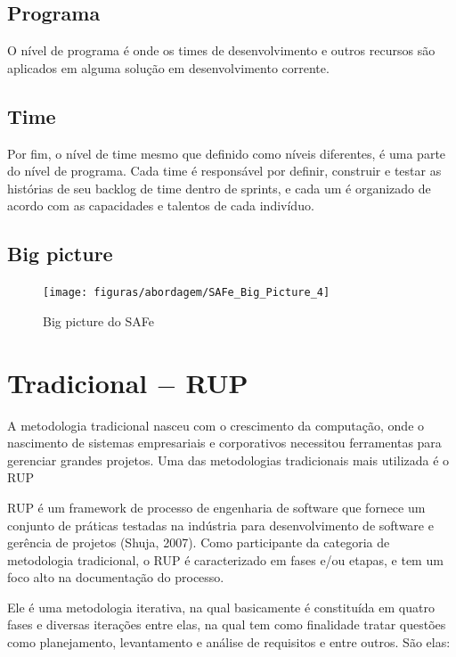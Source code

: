 \subsection{Programa}

  O nível de programa é onde os times de desenvolvimento e outros recursos são aplicados em alguma solução em desenvolvimento corrente.

\subsection{Time}

  Por fim, o nível de time mesmo que definido como níveis diferentes, é uma parte do nível de programa. Cada time é responsável por
  definir, construir e testar as histórias de seu backlog de time dentro de sprints, e cada um é organizado de acordo com as capacidades
  e talentos de cada indivíduo.

\subsection{Big picture}

  \begin{figure}[!htpb]
	  \centering
	  \texttt{[image: figuras/abordagem/SAFe\_Big\_Picture\_4]}
	  \caption{Big picture do SAFe}
  \end{figure}

\section{Tradicional $-$ RUP}

  A metodologia tradicional nasceu com o crescimento da computação, onde o nascimento de sistemas empresariais e corporativos necessitou
  ferramentas para gerenciar grandes projetos. Uma das metodologias tradicionais mais utilizada é o RUP

  RUP é um framework de processo de engenharia de software que fornece um conjunto de práticas testadas na indústria para desenvolvimento
  de software e gerência de projetos (Shuja, 2007). Como participante da categoria de metodologia tradicional, o RUP é caracterizado em
  fases e/ou etapas, e tem um foco alto na documentação do processo.

  Ele é uma metodologia iterativa, na qual basicamente é constituída em quatro fases e diversas iterações entre elas, na qual tem como
  finalidade tratar questões como planejamento, levantamento e análise de requisitos e entre outros. São elas:

